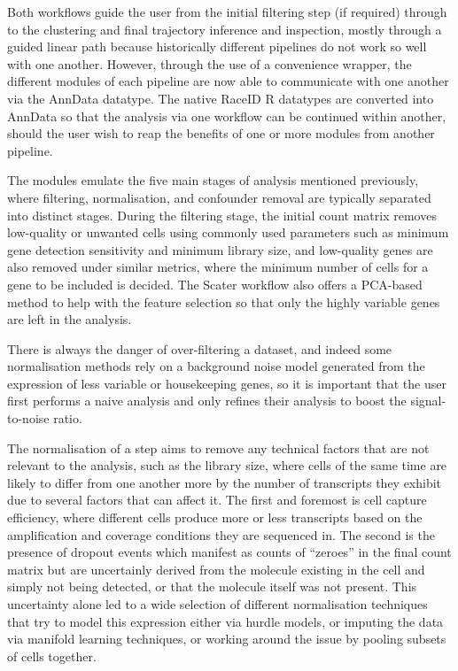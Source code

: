 \documentclass[a4paper,num-refs]{oup-contemporary}
\begin{document}
Both workflows guide the user from the initial filtering step (if required) through to the clustering and final trajectory inference and inspection, mostly through a guided linear path because historically different pipelines do not work so well with one another.
However, through the use of a convenience wrapper, the different modules of each pipeline are now able to communicate with one another via the AnnData datatype. The native RaceID R datatypes are converted into AnnData so that the analysis via one workflow can be continued within another, should the user wish to reap the benefits of one or more modules from another pipeline.

The modules emulate the five main stages of analysis mentioned previously, where filtering, normalisation, and confounder removal are typically separated into distinct stages. During the filtering stage, the initial count matrix removes low-quality or unwanted cells using commonly used parameters such as minimum gene detection sensitivity and minimum library size, and low-quality genes are also removed under similar metrics, where the minimum number of cells for a gene to be included is decided. The Scater workflow also offers a PCA-based method to help with the feature selection so that only the highly variable genes are left in the analysis.

There is always the danger of over-filtering a dataset, and indeed some normalisation methods rely on a background noise model generated from the expression of less variable or housekeeping genes, so it is important that the user first performs a naive analysis and only refines their analysis to boost the signal-to-noise ratio.

The normalisation of a step aims to remove any technical factors that are not relevant to the analysis, such as the library size, where cells of the same time are likely to differ from one another more by the number of transcripts they exhibit due to several factors that can affect it. The first and foremost is cell capture efficiency, where different cells produce more or less transcripts based on the amplification and coverage conditions they are sequenced in. The second is the presence of dropout events which manifest as counts of ``zeroes'' in the final count matrix but are uncertainly derived from the molecule existing in the cell and simply not being detected, or that the molecule itself was not present. This uncertainty alone led to a wide selection of different normalisation techniques that try to model this expression either via hurdle models, or imputing the data via manifold learning techniques, or working around the issue by pooling subsets of cells together.
\end{document}

